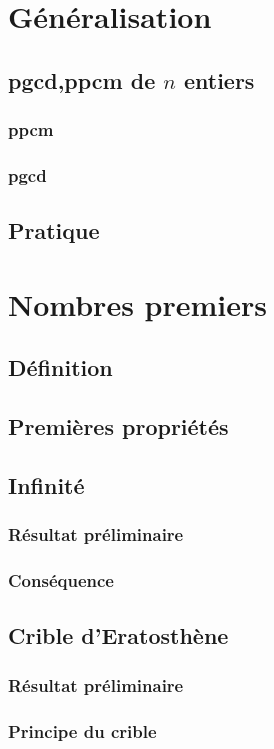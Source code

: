 \documentclass[12pt,a4paper,french]{book}
\begin{document}
	\section{Généralisation}
		\subsection{pgcd,ppcm de $n$ entiers}
			\subsubsection{ppcm}
			\subsubsection{pgcd}
		\subsection{Pratique}
	\section{Nombres premiers}
		\subsection{Définition}
		\subsection{Premières propriétés}
		\subsection{Infinité}
			\subsubsection{Résultat préliminaire}
			\subsubsection{Conséquence}
		\subsection{Crible d'Eratosthène}
			\subsubsection{Résultat préliminaire}
			\subsubsection{Principe du crible}
\end{document}

